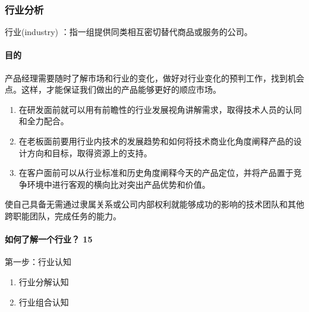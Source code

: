 \documentclass[letterpaper,10pt,english]{sphinxmanual}
\begin{document}
\subsubsection{行业分析}
\label{\detokenize{chapter_knowledge/industry_analysis:industry-analysis}}\label{\detokenize{chapter_knowledge/industry_analysis:id1}}\label{\detokenize{chapter_knowledge/industry_analysis::doc}}
行业(industry)
：指一组提供同类相互密切替代商品或服务的公司。%
\begin{footnote}[499]\sphinxAtStartFootnote
{}
%
\end{footnote}


\paragraph{目的}
\label{\detokenize{chapter_knowledge/industry_analysis:id2}}
产品经理需要随时了解市场和行业的变化，做好对行业变化的预判工作，找到机会点。这样，才能保证我们做出的产品能够更好的顺应市场。
\begin{enumerate}
%
\item {} 
在研发面前就可以用有前瞻性的行业发展视角讲解需求，取得技术人员的认同和全力配合。

\item {} 
在老板面前要用行业内技术的发展趋势和如何将技术商业化角度阐释产品的设计方向和目标，取得资源上的支持。

\item {} 
在客户面前可以从行业标准和历史角度阐释今天的产品定位，并将产品置于竞争环境中进行客观的横向比对突出产品优势和价值。%
\begin{footnote}[500]\sphinxAtStartFootnote
{}
%
\end{footnote}

\end{enumerate}

使自己具备无需通过隶属关系或公司内部权利就能够成功的影响的技术团队和其他跨职能团队，完成任务的能力。


\paragraph{如何了解一个行业？ 15\sphinxfootnotemark[501]}
\label{\detokenize{chapter_knowledge/industry_analysis:id3}}%
\begin{footnotetext}[501]\sphinxAtStartFootnote
{}
%
\end{footnotetext}\ignorespaces 
第一步：行业认知
\begin{enumerate}
%
\item {} 
行业分解认知

\item {} 
行业组合认知

\end{enumerate}
\end{document}
